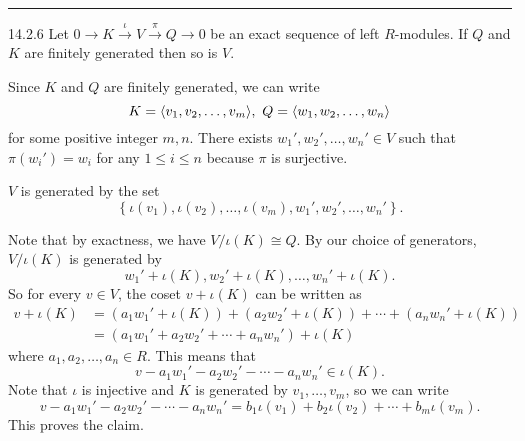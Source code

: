 \documentclass[a4paper, 12pt]{article}
\begin{document}
\noindent\rule{7in}{2.8pt}
\begin{problem}{14.2.6}
Let \(0\rightarrow K\xrightarrow{\iota} V\xrightarrow{\pi} Q\rightarrow 0\) be an exact sequence of left \(R\)-modules. If \(Q\) and \(K\) are finitely generated then so is \(V\).
\end{problem}
\begin{solution}
Since \(K\) and \(Q\) are finitely generated, we can write 
\[K=\langle v_1,v_2,\ldots,v_m\rangle,\ Q=\langle w_1,w_2,\ldots,w_n\rangle\]
for some positive integer \(m,n\). There exists \(w_1',w_2',\ldots,w_n'\in V\) such that \(\pi(w_i')=w_i\) for any \(1\leq i\leq n\) because \(\pi\) is surjective. 

\begin{claim}
\(V\) is generated by the set 
\[\left\{ \iota(v_1),\iota(v_2),\ldots,\iota(v_m),w_1',w_2',\ldots,w_n' \right\}.\]
\end{claim}
\begin{claimproof}
Note that by exactness, we have \(V/\iota(K)\cong Q\). By our choice of generators, \(V/\iota(K)\) is generated by 
\[w_1'+\iota(K),w_2'+\iota(K),\ldots,w_n'+\iota(K).\]
So for every \(v\in V\), the coset \(v+\iota(K)\) can be written as 
\begin{align*} 
v+\iota(K)&=(a_1w_1'+\iota(K))+(a_2w_2'+\iota(K))+\cdots+(a_nw_n'+\iota(K))\\ 
          &=(a_1w_1'+a_2w_2'+\cdots+a_nw_n')+\iota(K)
\end{align*}
where \(a_1,a_2,\ldots,a_n\in R\). This means that 
\[v-a_1w_1'-a_2w_2'-\cdots-a_nw_n'\in \iota(K).\]
Note that \(\iota\) is injective and \(K\) is generated by \(v_1,\ldots,v_m\), so we can write 
\[v-a_1w_1'-a_2w_2'-\cdots-a_nw_n'=b_1\iota(v_1)+b_2\iota(v_2)+\cdots+b_m\iota(v_m).\]
This proves the claim.
\end{claimproof}
\end{solution}
\end{document}
